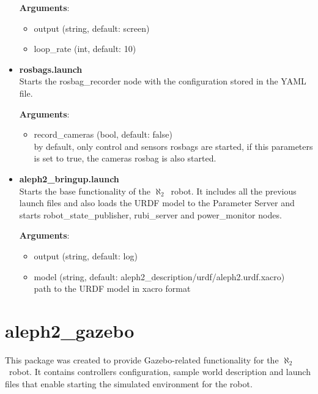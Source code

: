 \documentclass[english,inz,shortabstract]{iithesis}
\newcommand{\val}[1]{\textbf{\textsf{#1}}}
\newcommand{\rovername}{$\aleph_2$\ }
\begin{document}
\begin{itemize}
			\textbf{Arguments}:
			\begin{itemize}[itemsep=0pt, parsep=2pt, topsep=0pt]
				\item \textsf{output} (\textsf{string}, default: \textsf{screen})
				\item \textsf{loop\_rate} (\textsf{int}, default: \textsf{10})
			\end{itemize}

			\item \val{rosbags.launch}\\
			Starts the \textsf{rosbag\_recorder} node with the configuration stored in the YAML file.

			\textbf{Arguments}:
			\begin{itemize}[itemsep=0pt, parsep=2pt, topsep=0pt]
				\item \textsf{record\_cameras} (\textsf{bool}, default: \textsf{false})\\
				by default, only \textsf{control} and \textsf{sensors} rosbags are started, if this parameters is set to \textsf{true}, the \textsf{cameras} rosbag is also started. 
			\end{itemize}

			\item \val{aleph2\_bringup.launch}\\
			Starts the base functionality of the \rovername robot. It includes all the previous launch files and also loads the URDF model to the Parameter Server and starts \textsf{robot\_state\_publisher}, \textsf{rubi\_server} and \textsf{power\_monitor} nodes.

			\textbf{Arguments}:
			\begin{itemize}[itemsep=0pt, parsep=2pt, topsep=0pt]
				\item \textsf{output} (\textsf{string}, default: \textsf{log})
				\item \textsf{model} (\textsf{string}, default: \textsf{aleph2\_description/urdf/aleph2.urdf.xacro})\\
				path to the URDF model in xacro format
			\end{itemize}


		\end{itemize}

\section{aleph2\_gazebo}
This package was created to provide Gazebo-related functionality for the \rovername robot. It contains controllers configuration, sample world description and launch files that enable starting the simulated environment for the robot.
\end{document}
